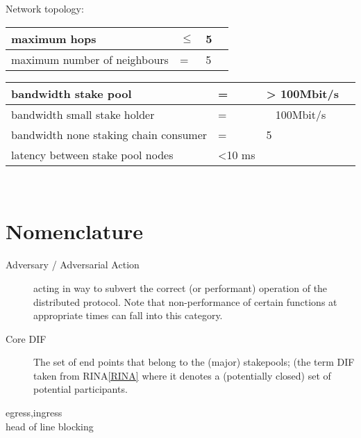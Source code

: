 \documentclass{report}
\theoremstyle{definition}{
  \newtheorem{lemma}{Lemma}[section] %
  \newtheorem{definition}[lemma]{Definition}
}
\theoremstyle{theorem}{
  \newtheorem{invariant}[lemma]{Invariant}
  \newtheorem{proofobligation}[lemma]{Proof Obligation}
}
\numberwithin{equation}{lemma}
\begin{document}
{Network topology:\\
\begin{tabular}{p{4cm}p{1cm}p{6cm}p{1cm}} \hline
  maximum hops                         & $\le$ &  5                         &  \\ \hline
  maximum number of neighbours          & = &  5                         &  \\ \hline
\end{tabular}

\begin{tabular}{p{4cm}p{1cm}p{6cm}p{1cm}} \hline
  bandwidth stake pool                             & = &  > 100Mbit/s             &  \\ \hline
  bandwidth small stake holder                    & = &  ~ 100Mbit/s             &  \\ \hline
  bandwidth none staking chain consumer          & = &  5                       &  \\ \hline
  latency  between stake pool nodes                & <10 ms                       &  \\ \hline
\end{tabular}\\


\chapter{Nomenclature}
\begin{description}
\item[Adversary / Adversarial Action]
  acting in way to subvert the correct (or performant) operation of the distributed protocol.
  Note that non-performance of certain functions at appropriate times can
  fall into this category.
\item[Core DIF]
  The set of end points that belong to the (major)
  stakepools; (the term DIF taken from RINA\ref{RINA} where it denotes
  a (potentially closed) set of potential participants.
\item[egress,ingress]
\item[head of line blocking]
\end{description}
}
\end{document}
